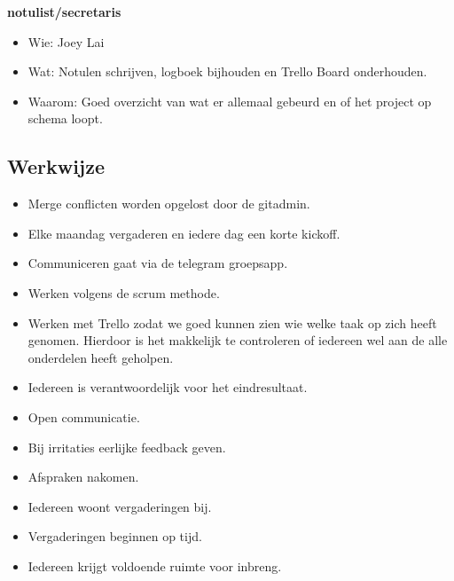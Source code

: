 \documentclass{uva-inf-article}
\begin{document}
\textbf{notulist/secretaris}
\begin{itemize}[noitemsep]
	\item Wie: Joey Lai
	\item Wat: Notulen schrijven, logboek bijhouden en Trello Board onderhouden.
	\item Waarom: Goed overzicht van wat er allemaal gebeurd en of het project op schema loopt.
\end{itemize}

\subsection{Werkwijze}
\begin{itemize}[noitemsep]
	\item Merge conflicten worden opgelost door de gitadmin.
	\item Elke maandag vergaderen en iedere dag een korte kickoff.
	\item Communiceren gaat via de telegram groepsapp.
	\item Werken volgens de scrum methode.
	\item Werken met Trello zodat we goed kunnen zien wie welke taak op zich heeft genomen. Hierdoor is het makkelijk te controleren of iedereen wel aan de alle onderdelen heeft geholpen.
	\item Iedereen is verantwoordelijk voor het eindresultaat.
	\item Open communicatie.
	\item Bij irritaties eerlijke feedback geven.
	\item Afspraken nakomen.
	\item Iedereen woont vergaderingen bij.
	\item Vergaderingen beginnen op tijd.
	\item Iedereen krijgt voldoende ruimte voor inbreng.
\end{itemize}


%


\end{document}
